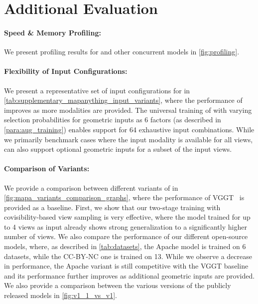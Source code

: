 \section{Additional Evaluation}

\paragraph{Speed \& Memory Profiling:} We present profiling results for \coolname and other concurrent models in \cref{fig:profiling}.

\vspace{-0.15em}

\paragraph{Flexibility of Input Configurations:}

We present a representative set of input configurations for \coolname in \cref{tab:supplementary_mapanything_input_variants}, where the performance of \coolname improves as more modalities are provided.
The universal training of \coolname with varying selection probabilities for geometric inputs as 6 factors (as described in \cref{para:aug_training}) enables support for 64 exhaustive input combinations.
While we primarily benchmark cases where the input modality is available for all views, \coolname can also support optional geometric inputs for a subset of the input views.

\vspace{-0.15em}




\paragraph{Comparison of \coolname Variants:}

We provide a comparison between different variants of \coolname in \cref{fig:mapa_variants_comparison_graphs}, where the performance of VGGT~\cite{WangCKVRN2025} is provided as a baseline.
First, we show that our two-stage training with covisibility-based view sampling is very effective, where the \coolname model trained for up to 4 views as input already shows strong generalization to a significantly higher number of views.
We also compare the performance of our different open-source models, where, as described in \cref{tab:datasets}, the Apache model is trained on 6 datasets, while the CC-BY-NC one is trained on 13.
While we observe a decrease in performance, the Apache variant is still competitive with the VGGT baseline and its performance further improves as additional geometric inputs are provided.
We also provide a comparison between the various versions of the publicly released models in \cref{fig:v1_1_vs_v1}.

